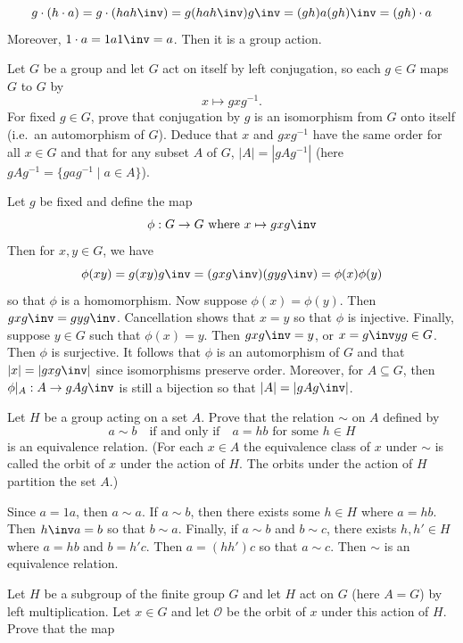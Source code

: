 \begin{problems}
\begin{sol}
        \[g \cdot (h \cdot a) = g \cdot (hah\inv) = g(hah\inv)g\inv = (gh)a(gh)\inv = (gh) \cdot a\]
        Moreover, $1 \cdot a = 1a1\inv = a$. Then it is a group action.
    \end{sol}
    \item \label{ex1.7.17} Let $G$ be a group and let $G$ act on itself by left conjugation, so each $g\in G$ maps $G$ to $G$ by
    \[ x \mapsto gxg^{-1}. \]
    For fixed $g\in G$, prove that conjugation by $g$ is an isomorphism from $G$ onto itself (i.e.\ an automorphism of $G$). Deduce that $x$ and $gxg^{-1}$ have the same order for all $x\in G$ and that for any subset $A$ of $G$, $|A| = |gAg^{-1}|$ (here $gAg^{-1} = \{gag^{-1} \mid a\in A\}$).
    \begin{sol}
        Let $g$ be fixed and define the map
        \[\phi : G \to G \text{ where $x \mapsto gxg\inv$}\]
        Then for $x, y \in G$, we have
        \[\phi(xy) = g(xy)g\inv = (gxg\inv)(gyg\inv) = \phi(x)\phi(y)\]
        so that $\phi$ is a homomorphism. Now suppose $\phi(x) = \phi(y)$. Then $gxg\inv = gyg\inv$. Cancellation shows that $x = y$ so that $\phi$ is injective. Finally, suppose $y \in G$ such that $\phi(x) = y$. Then $gxg\inv = y$, or $x = g\inv yg \in G$. Then $\phi$ is surjective. It follows that $\phi$ is an automorphism of $G$ and that $|x| = |gxg\inv|$ since isomorphisms preserve order. Moreover, for $A \subseteq G$, then $\phi|_A : A \to gAg\inv$ is still a bijection so that $|A| = |gAg\inv|$.
    \end{sol}
    \item Let $H$ be a group acting on a set $A$. Prove that the relation $\sim$ on $A$ defined by  
    \[
    a \sim b \quad \text{if and only if} \quad a = hb \text{ for some } h\in H
    \]
    is an equivalence relation. (For each $x\in A$ the equivalence class of $x$ under $\sim$ is called the orbit of $x$ under the action of $H$. The orbits under the action of $H$ partition the set $A$.)
    \begin{sol}
        Since $a = 1a$, then $a \sim a$. If $a \sim b$, then there exists some $h \in H$ where $a = hb$. Then $h\inv a = b$ so that $b \sim a$. Finally, if $a \sim b$ and $b \sim c$, there exists $h, h' \in H$ where $a = hb$ and $b = h'c$. Then $a = (hh')c$ so that $a \sim c$. Then $\sim$ is an equivalence relation.
    \end{sol}
    \item \label{ex1.7.19} Let $H$ be a subgroup of the finite group $G$ and let $H$ act on $G$ (here $A = G$) by left multiplication. Let $x\in G$ and let $\mathcal{O}$ be the orbit of $x$ under this action of $H$. Prove that the map  

\end{problems}
